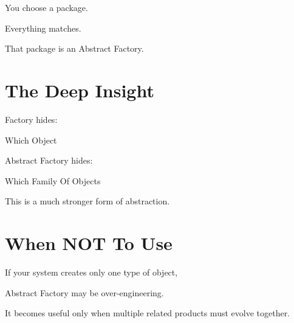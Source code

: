 \documentclass[11pt,a4paper]{book}
\begin{document}
You choose a package.


Everything matches.


That package is an
Abstract Factory.


\section{The Deep Insight}

Factory hides:


Which Object


Abstract Factory hides:


Which Family Of Objects


This is a much stronger form
of abstraction.


\section{When NOT To Use}

\begin{trap}

If your system creates only
one type of object,

Abstract Factory may be
over-engineering.


It becomes useful only when
multiple related products
must evolve together.

\end{trap}

\end{document}
